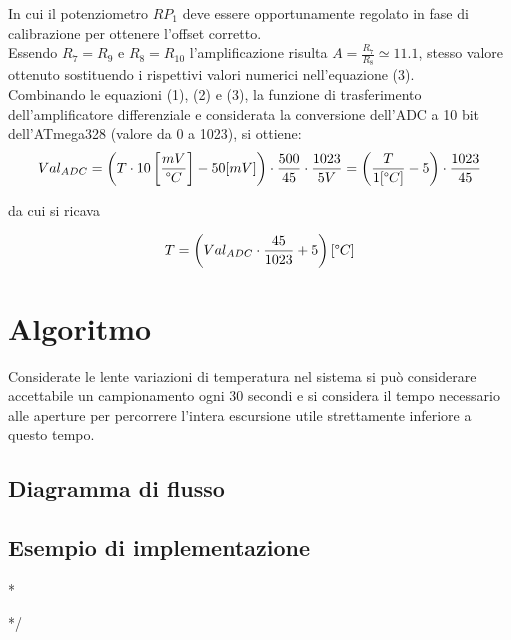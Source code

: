 \documentclass[12pt]{article}
\newenvironment{changemargin}[2]{%
    \begin{list}{}{%
    \setlength{\topsep}{0pt}%
    \setlength{\leftmargin}{#1}%
    \setlength{\rightmargin}{#2}%
    \setlength{\listparindent}{\parindent}%
    \setlength{\itemindent}{\parindent}%
    \setlength{\parsep}{\parskip}%
    }%
    \item[]}{\end{list}}
\begin{document}
        In cui il potenziometro $RP_1$ deve essere opportunamente regolato in fase di calibrazione per ottenere l'offset corretto.\\
        Essendo $R_7=R_9$ e $R_8=R_{10}$ l'amplificazione risulta $A = \frac{R_7}{R_8} \simeq 11.1$, stesso valore ottenuto sostituendo i rispettivi valori numerici nell'equazione (3).\\
        Combinando le equazioni (1), (2) e (3), la funzione di trasferimento dell'amplificatore differenziale e considerata la conversione dell'ADC a 10 bit dell'ATmega328 (valore da 0 a 1023), si ottiene:
        \begin{equation}
            Val_{ADC} = \left( T \cdot 10 \left[ \frac{mV}{\degree C} \right] - 50 [mV] \right) \cdot \frac{500}{45} \cdot \frac{1023}{5V} = \left( \frac{T}{1 [\degree C]} - 5 \right) \cdot  \frac{1023}{45}
        \end{equation}
        
        \noindent
        da cui si ricava
        
        \begin{equation}
            T = \left( Val_{ADC} \cdot \frac{45}{1023} + 5 \right) [\degree C]
        \end{equation}
    
\vspace{1cm}

\section{Algoritmo}
    Considerate le lente variazioni di temperatura nel sistema si può con\-si\-de\-ra\-re accettabile un campionamento ogni 30 secondi e si considera il tempo necessario alle aperture per percorrere l'intera escursione utile strettamente inferiore a questo tempo.
    \subsection{Diagramma di flusso}

    
    \subsection{Esempio di implementazione}

\/*
    \begin{changemargin}{-1cm}{-1cm}

    
    \end{changemargin}
*/    
  
   
    \vfill
    \let\thefootnote\relax{}
\end{document}
